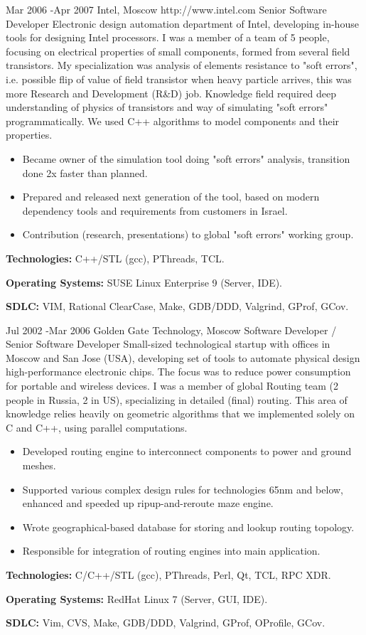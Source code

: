 \documentclass[10pt]{article} %
\begin{document}
\job
{Mar 2006 -}{Apr 2007}
{Intel, Moscow}
{http://www.intel.com}
{Senior Software Developer}
{Electronic design automation department of Intel, developing in-house tools for designing Intel processors.
I was a member of a team of 5 people, focusing on electrical properties of small components, formed from several 
field transistors. My specialization was analysis of elements resistance to "soft errors", i.e. possible
flip of value of field transistor when heavy particle arrives, this was more Research and Development (R\&D) job.
Knowledge field required deep understanding of physics of transistors and way of simulating "soft errors" programmatically.
We used C++ algorithms to model components and their properties.}
{\begin{itemize}
\item{Became owner of the simulation tool doing "soft errors" analysis, transition done 2x faster than planned.}
\item{Prepared and released next generation of the tool, based on modern dependency tools and requirements 
from customers in Israel.}
\item{Contribution (research, presentations) to global "soft errors" working group.}
\end{itemize}}
{\rule{0mm}{5mm}\textbf{Technologies:} C++/STL (gcc), PThreads, TCL.\\
\rule{0mm}{5mm}\textbf{Operating Systems:} SUSE Linux Enterprise 9 (Server, IDE).\\
\rule{0mm}{5mm}\textbf{SDLC:} VIM, Rational ClearCase, Make, GDB/DDD, Valgrind, GProf, GCov.
}


\job
{Jul 2002 -}{Mar 2006}
{Golden Gate Technology, Moscow}
{}
{Software Developer / Senior Software Developer}
{Small-sized technological startup with offices in Moscow and San Jose (USA), developing set of tools
to automate physical design high-performance electronic chips. The focus was to reduce power consumption
for portable and wireless devices. I was a member of global Routing team (2 people in Russia, 2 in US), 
specializing in detailed (final) routing. This area of knowledge relies heavily on geometric algorithms
that we implemented solely on C and C++, using parallel computations.}
{\begin{itemize}
\item{Developed routing engine to interconnect components to power and ground meshes.}
\item{Supported various complex design rules for technologies 65nm and below, enhanced and speeded up ripup-and-reroute maze engine.}
\item{Wrote geographical-based database for storing and lookup routing topology.}
\item{Responsible for integration of routing engines into main application.}
\end{itemize}}
{\rule{0mm}{5mm}\textbf{Technologies:} C/C++/STL (gcc), PThreads, Perl, Qt, TCL, RPC XDR.\\
\rule{0mm}{5mm}\textbf{Operating Systems:} RedHat Linux 7 (Server, GUI, IDE).\\
\rule{0mm}{5mm}\textbf{SDLC:} Vim, CVS, Make, GDB/DDD, Valgrind, GProf, OProfile, GCov.
}
\end{document}
